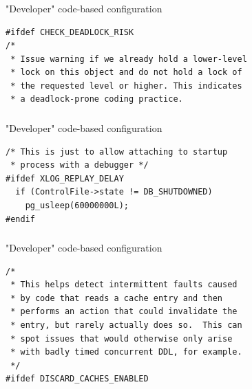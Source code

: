 \documentclass[usenames,dvipsnames, 18pt, compress, aspectratio=169]{beamer}
\begin{document}
\begin{frame}[fragile]{}
    \frametitle{}
    \begin{center}

        "Developer" code-based configuration

		\vspace{0.5cm}
        \begin{verbatim}
#ifdef CHECK_DEADLOCK_RISK
/*
 * Issue warning if we already hold a lower-level
 * lock on this object and do not hold a lock of
 * the requested level or higher. This indicates
 * a deadlock-prone coding practice.
	        \end{verbatim}

    \end{center}
\end{frame}

\begin{frame}[fragile]{}
    \frametitle{}
    \begin{center}

        "Developer" code-based configuration

		\vspace{0.5cm}
        \begin{verbatim}
/* This is just to allow attaching to startup
 * process with a debugger */
#ifdef XLOG_REPLAY_DELAY
  if (ControlFile->state != DB_SHUTDOWNED)
    pg_usleep(60000000L);
#endif
	        \end{verbatim}

    \end{center}
\end{frame}

\begin{frame}[fragile]{}
    \frametitle{}
    \begin{center}

        "Developer" code-based configuration

		\vspace{0.5cm}
        \begin{verbatim}
/*
 * This helps detect intermittent faults caused
 * by code that reads a cache entry and then
 * performs an action that could invalidate the
 * entry, but rarely actually does so.  This can
 * spot issues that would otherwise only arise
 * with badly timed concurrent DDL, for example.
 */
#ifdef DISCARD_CACHES_ENABLED

	        \end{verbatim}

    \end{center}
\end{frame}
\end{document}
